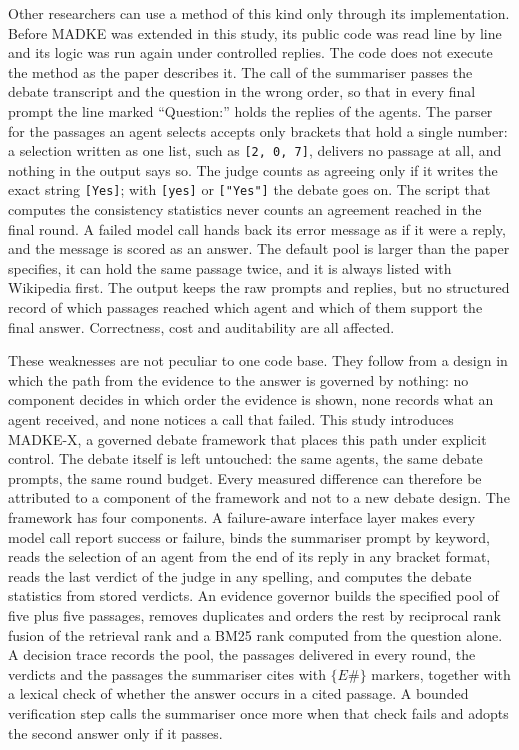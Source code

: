 Other researchers can use a method of this kind only through its implementation. Before MADKE was extended in this study, its public code \cite{madke2025code} was read line by line and its logic was run again under controlled replies. The code does not execute the method as the paper describes it. The call of the summariser passes the debate transcript and the question in the wrong order, so that in every final prompt the line marked ``Question:'' holds the replies of the agents. The parser for the passages an agent selects accepts only brackets that hold a single number: a selection written as one list, such as \texttt{[2, 0, 7]}, delivers no passage at all, and nothing in the output says so. The judge counts as agreeing only if it writes the exact string \texttt{[Yes]}; with \texttt{[yes]} or \texttt{["Yes"]} the debate goes on. The script that computes the consistency statistics never counts an agreement reached in the final round. A failed model call hands back its error message as if it were a reply, and the message is scored as an answer. The default pool is larger than the paper specifies, it can hold the same passage twice, and it is always listed with Wikipedia first. The output keeps the raw prompts and replies, but no structured record of which passages reached which agent and which of them support the final answer. Correctness, cost and auditability are all affected.

These weaknesses are not peculiar to one code base. They follow from a design in which the path from the evidence to the answer is governed by nothing: no component decides in which order the evidence is shown, none records what an agent received, and none notices a call that failed. This study introduces MADKE-X, a governed debate framework that places this path under explicit control. The debate itself is left untouched: the same agents, the same debate prompts, the same round budget. Every measured difference can therefore be attributed to a component of the framework and not to a new debate design. The framework has four components. A failure-aware interface layer makes every model call report success or failure, binds the summariser prompt by keyword, reads the selection of an agent from the end of its reply in any bracket format, reads the last verdict of the judge in any spelling, and computes the debate statistics from stored verdicts. An evidence governor builds the specified pool of five plus five passages, removes duplicates and orders the rest by reciprocal rank fusion \cite{cormack2009rrf} of the retrieval rank and a BM25 rank \cite{robertson2009bm25} computed from the question alone. A decision trace records the pool, the passages delivered in every round, the verdicts and the passages the summariser cites with $\{E\#\}$ markers, together with a lexical check of whether the answer occurs in a cited passage. A bounded verification step calls the summariser once more when that check fails and adopts the second answer only if it passes.

